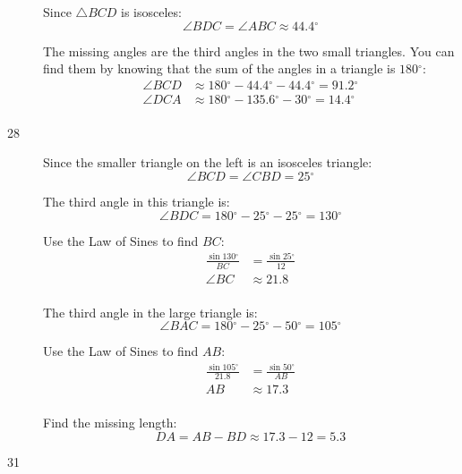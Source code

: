\documentclass{exam}
\newcommand{\dg}{\ensuremath{^\circ}}
\begin{document}
\begin{description}
        Since $\triangle BCD$ is isosceles:
        \[
          \angle BDC = \angle ABC \approx 44.4 \dg
        \]

        The missing angles are the third angles in the two small triangles.  You can find them by knowing that the sum
        of the angles in a triangle is $180 \dg$:
        \begin{align*}
          \angle BCD & \approx 180 \dg - 44.4 \dg - 44.4 \dg = \boxed{ 91.2 \dg } \\
          \angle DCA & \approx 180 \dg - 135.6 \dg - 30 \dg = \boxed{ 14.4 \dg } \\
        \end{align*}

      \item[28] 
        Since the smaller triangle on the left is an isosceles triangle:
        \[
          \angle BCD = \angle CBD = 25 \dg
        \]

        The third angle in this triangle is: 
        \[
          \angle BDC = 180 \dg - 25 \dg - 25 \dg = 130 \dg
        \]

        Use the Law of Sines to find $BC$:
        \begin{align*}
          \frac{\sin 130 \dg}{BC} & = \frac{\sin 25 \dg}{12} \\
          \angle BC               & \approx 21.8 \\
        \end{align*}

        The third angle in the large triangle is: 
        \[
          \angle BAC = 180 \dg - 25 \dg - 50 \dg = 105 \dg
        \]

        Use the Law of Sines to find $AB$:
        \begin{align*}
          \frac{\sin 105 \dg}{21.8} & = \frac{\sin 50 \dg}{AB} \\
          AB                        & \approx 17.3 \\
        \end{align*}

        Find the missing length:
        \[
          DA = AB - BD \approx 17.3 - 12 = \boxed{ 5.3 }
        \]

      \item[31] 
        \begin{parts}
          \part


\end{parts}
\end{description}
\end{document}
